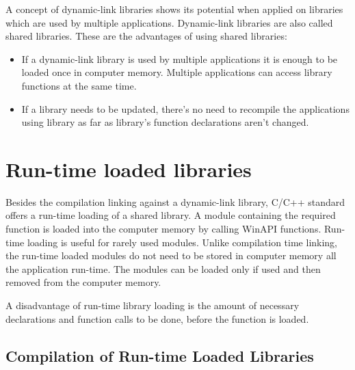 

A concept of dynamic-link libraries shows its potential when applied on libraries which are used by multiple applications. Dynamic-link libraries are also called shared libraries. These are the advantages of using shared libraries:

\begin{itemize}
\item If a dynamic-link library is used by multiple applications it is enough to be loaded once in computer memory. Multiple applications can access library functions at the same time.
\item If a library needs to be updated, there's no need to recompile the applications using library as far as library's function declarations aren't changed.
\end{itemize}


\section{Run-time loaded libraries}

Besides the compilation linking against a dynamic-link library, C/C++ standard offers a run-time loading of a shared library. A module containing the required function is loaded into the computer memory by calling WinAPI functions. Run-time loading is useful for rarely used modules. Unlike compilation time linking, the run-time loaded modules do not need to be stored in computer memory all the application run-time. The modules can be loaded only if used and then removed from the computer memory.

A disadvantage of run-time library loading is the amount of necessary declarations and function calls to be done, before the function is loaded.

\subsection{Compilation of Run-time Loaded Libraries}



